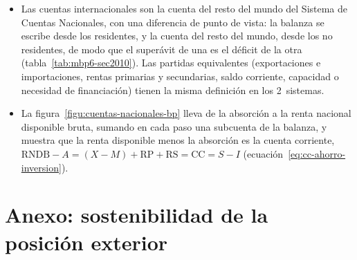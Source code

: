 \documentclass[11pt]{article}
\begin{document}
\begin{itemize}
\item Las cuentas internacionales son la cuenta del resto del mundo del Sistema de Cuentas Nacionales, con una diferencia de punto de vista: la balanza se escribe desde los residentes, y la cuenta del resto del mundo, desde los no residentes, de modo que el superávit de una es el déficit de la otra (tabla~\ref{tab:mbp6-sec2010}). Las partidas equivalentes (exportaciones e importaciones, rentas primarias y secundarias, saldo corriente, capacidad o necesidad de financiación) tienen la misma definición en los 2~sistemas.
\item La figura~\ref{figu:cuentas-nacionales-bp} lleva de la absorción a la renta nacional disponible bruta, sumando en cada paso una subcuenta de la balanza, y muestra que la renta disponible menos la absorción es la cuenta corriente, $\mathrm{RNDB}-A=(X-M)+\mathrm{RP}+\mathrm{RS}=\mathrm{CC}=S-I$ (ecuación~\eqref{eq:cc-ahorro-inversion}).
\end{itemize}

\begin{infografia}[H]
\centering
\caption{De la absorción a la renta nacional disponible bruta}\label{figu:cuentas-nacionales-bp}
\end{infografia}

\section{Anexo: sostenibilidad de la posición exterior}\label{anexo:sostenibilidad}
\end{document}
